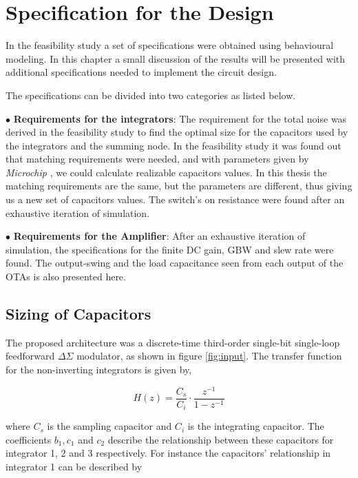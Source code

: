 \chapter{Specification for the Design}\label{specifiation}
In the feasibility study a set of specifications were obtained using behavioural modeling. In this chapter a small discussion of the results will be presented with additional specifications needed to implement the circuit design.

The specifications can be divided into two categories as listed below. 

$\bullet$ \textbf{Requirements for the integrators}: The requirement for the total noise was derived in the feasibility study to find the optimal size for the capacitors used by the integrators and the summing node. In the feasibility study it was found out that matching requirements were needed, and with parameters given by \textit{Microchip} \cite{private}, we could calculate realizable capacitors values. In this thesis the matching requirements are the same, but the parameters are different, thus giving us a new set of capacitors values. The switch's on resistance were found after an exhaustive iteration of simulation.

$\bullet$ \textbf{Requirements for the Amplifier}: After an exhaustive iteration of simulation, the specifications for the finite DC gain, GBW and slew rate were found. The output-swing and the load capacitance seen from each output of the OTAs is also presented here. 

\section{Sizing of Capacitors}
The proposed architecture was a discrete-time third-order single-bit single-loop feedforward $\Delta\Sigma$ modulator, as shown in figure \ref{fig:input}. The transfer function for the non-inverting integrators is given by,

\begin{equation}\label{transfer_integrator}
    H(z) = \frac{C_s}{C_i}\cdot \frac{z^{-1}}{1 - z^{-1}}
\end{equation}

where $C_s$ is the sampling capacitor and $C_i$ is the integrating capacitor. The coefficients $b_1, c_1$ and $c_2$ describe the relationship between these capacitors for integrator 1, 2 and 3 respectively. For instance the capacitors' relationship in integrator 1 can be described by

